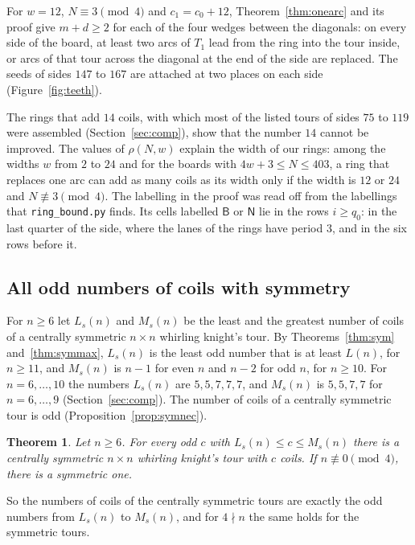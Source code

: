 \documentclass[11pt]{amsart}
\newtheorem{theorem}{Theorem}
\theoremstyle{remark}
\begin{document}
For $w=12$, $N\equiv3\pmod 4$ and $c_1=c_0+12$, Theorem~\ref{thm:onearc} and its proof give $m+d\ge2$ for each of
the four wedges between the diagonals: on every side of the board, at least two arcs of $T_1$ lead from the ring
into the tour inside, or arcs of that tour across the diagonal at the end of the side are replaced. The seeds of
sides $147$ to $167$ are attached at two places on each side (Figure~\ref{fig:teeth}).

The rings that add $14$ coils, with which most of the listed tours of sides $75$ to $119$ were assembled
(Section~\ref{sec:comp}), show that the number $14$ cannot be improved. The values of $\rho(N,w)$ explain the width
of our rings: among the widths $w$ from $2$ to $24$ and for the boards with $4w+3\le N\le403$, a ring that replaces
one arc can add as many coils as its width only if the width is $12$ or $24$ and $N\not\equiv3\pmod 4$. The labelling
in the proof was read off from the labellings that \texttt{ring\_bound.py} finds. Its cells labelled $\mathsf B$ or
$\mathsf N$ lie in the rows $i\ge q_0$: in the last quarter of the side, where the lanes of the rings have
period $3$, and in the six rows before it.

\subsection*{All odd numbers of coils with symmetry}
For $n\ge6$ let $L_s(n)$ and $M_s(n)$ be the least and the greatest number of coils of a centrally symmetric
$n\times n$ whirling knight's tour. By Theorems~\ref{thm:sym} and~\ref{thm:symmax}, $L_s(n)$ is the least odd number
that is at least $L(n)$, for $n\ge11$, and $M_s(n)$ is $n-1$ for even $n$ and $n-2$ for odd $n$, for $n\ge10$. For
$n=6,\dots,10$ the numbers $L_s(n)$ are $5,5,7,7,7$, and $M_s(n)$ is $5,5,7,7$ for $n=6,\dots,9$
(Section~\ref{sec:comp}). The number of coils of a centrally symmetric tour is odd
(Proposition~\ref{prop:symnec}).

\begin{theorem}\label{thm:symspec}
Let $n\ge6$. For every odd $c$ with $L_s(n)\le c\le M_s(n)$ there is a centrally symmetric $n\times n$ whirling
knight's tour with $c$ coils. If $n\not\equiv0\pmod 4$, there is a symmetric one.
\end{theorem}
So the numbers of coils of the centrally symmetric tours are exactly the odd numbers from $L_s(n)$ to $M_s(n)$, and
for $4\nmid n$ the same holds for the symmetric tours.
\end{document}
